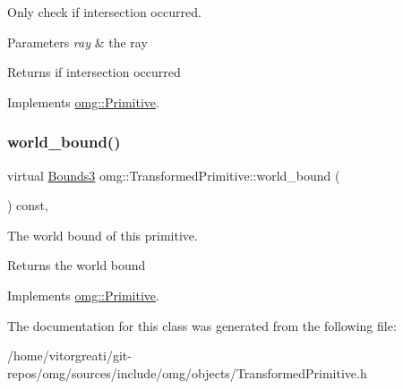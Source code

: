 Only check if intersection occurred. 


\begin{DoxyParams}{Parameters}
{\em ray} & the ray \\
\hline
\end{DoxyParams}
\begin{DoxyReturn}{Returns}
if intersection occurred 
\end{DoxyReturn}


Implements \mbox{\hyperlink{classomg_1_1_primitive_a139c012a57ad2322c5bef078b5d7e653}{omg\+::\+Primitive}}.

\mbox{\label{classomg_1_1_transformed_primitive_a5478871a0d44380d5e64301746d6774b}} 
\subsubsection{\texorpdfstring{world\_bound()}{world\_bound()}}
{\footnotesize\ttfamily virtual \mbox{\hyperlink{classomg_1_1_bounds3}{Bounds3}} omg\+::\+Transformed\+Primitive\+::world\+\_\+bound (\begin{DoxyParamCaption}{ }\end{DoxyParamCaption}) const\hspace{0.3cm}{\ttfamily [inline]}, {\ttfamily [virtual]}}



The world bound of this primitive. 

\begin{DoxyReturn}{Returns}
the world bound 
\end{DoxyReturn}


Implements \mbox{\hyperlink{classomg_1_1_primitive_a457b29547bc918cf8874b24f5168ff86}{omg\+::\+Primitive}}.



The documentation for this class was generated from the following file\+:\begin{DoxyCompactItemize}
\item 
/home/vitorgreati/git-\/repos/omg/sources/include/omg/objects/Transformed\+Primitive.\+h\end{DoxyCompactItemize}
